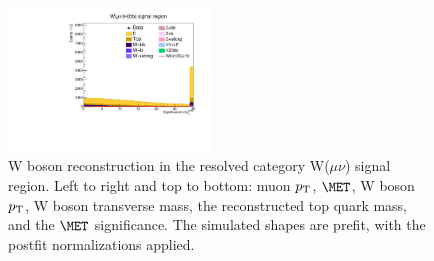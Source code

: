 \begin{figure}[tbp]
\begin{center}
    \includegraphics[width=0.48\textwidth]{figures/wlnhbb2016/resolved/WmnWHSR_pfmetsig.pdf}
    \caption{W boson reconstruction in the resolved category W($\mu\nu$) signal region.
    Left to right and top to bottom: muon $p_{\mathrm{T}}$, $\MET$, W boson $p_{\mathrm{T}}$, W boson transverse mass,
    the reconstructed top quark mass, and the $\MET$ significance.
    The simulated shapes are prefit, with the postfit normalizations applied.}
    \label{fig:res_WmnSR_WBosons}
  \end{center}
\end{figure}
\clearpage

